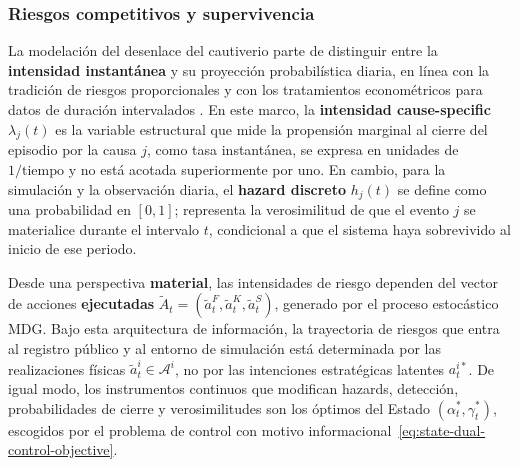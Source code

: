 \documentclass[12pt]{article}
\providecommand{\textcite}{\citet}
\theoremstyle{definition}
\theoremstyle{remark}
\newcommand{\1}{\mathbf{1}}
\begin{document}
\subsubsection{Riesgos competitivos y supervivencia}
\label{subsec:intensidades-prop}

La modelación del desenlace del cautiverio parte de distinguir entre la \textbf{intensidad instantánea} y su proyección probabilística diaria, en línea con la tradición de riesgos proporcionales \textcite{Cox1972} y con los tratamientos econométricos para datos de duración intervalados \textcite{Greene2012,Wooldridge2010}. En este marco, la \textbf{intensidad cause-specific} $\lambda_j(t)$ es la variable estructural que mide la propensión marginal al cierre del episodio por la causa $j$, como tasa instantánea, se expresa en unidades de $1/\mathrm{tiempo}$ y no está acotada superiormente por uno. En cambio, para la simulación y la observación diaria, el \textbf{hazard discreto} $h_j(t)$ se define como una probabilidad en $[0,1]$; representa la verosimilitud de que el evento $j$ se materialice durante el intervalo $t$, condicional a que el sistema haya sobrevivido al inicio de ese periodo.

Desde una perspectiva \textbf{material}, las intensidades de riesgo dependen del vector de acciones \textbf{ejecutadas} $\tilde{A}_t = (\tilde{a}_t^F, \tilde{a}_t^K, \tilde{a}_t^S)$, generado por el proceso estocástico MDG. Bajo esta arquitectura de información, la trayectoria de riesgos que entra al registro público y al entorno de simulación está determinada por las realizaciones físicas $\tilde{a}_t^i \in \mathcal{A}^i$, no por las intenciones estratégicas latentes $a_t^{i\ast}$. De igual modo, los instrumentos continuos que modifican hazards, detección, probabilidades de cierre y verosimilitudes son los óptimos del Estado $(\alpha_t^\ast,\gamma_t^\ast)$, escogidos por el problema de control con motivo informacional~\eqref{eq:state-dual-control-objective}.
\end{document}
